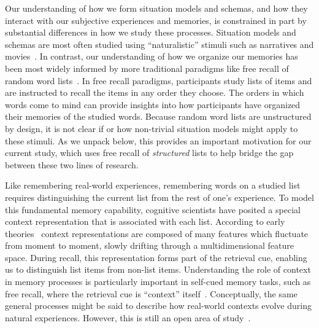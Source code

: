 \documentclass[11pt]{article}
\begin{document}

Our understanding of how we form situation models and schemas, and how they
interact with our subjective experiences and memories, is constrained in part
by substantial differences in how we study these processes. Situation models
and schemas are most often studied using ``naturalistic'' stimuli such as
narratives and movies~\citep{ZwaaEtal95,ZwaaRadv98, NastEtal20}. In contrast,
our understanding of how we organize our memories has been most widely informed
by more traditional paradigms like free recall of random word
lists~\citep{Kaha12, Kaha20}. In free recall paradigms, participants study lists of items
and are instructed to recall the items in any order they choose. The orders in
which words come to mind can provide insights into how participants have
organized their memories of the studied words. Because random word lists are
unstructured by design, it is not clear if or how non-trivial situation
models might apply to these stimuli. As we unpack below, this provides an
important motivation for our current study, which uses free recall of
\textit{structured} lists to help bridge the gap between these two lines of
research.

Like remembering real-world experiences, remembering words on a studied list
requires distinguishing the current list from the rest of one's experience. To
model this fundamental memory capability, cognitive scientists have posited a
special context representation that is associated with each list. According to
early theories~\citep[e.g.,][]{Este55a,AndeBowe72} context representations are
composed of many features which fluctuate from moment to moment, slowly
drifting through a multidimensional feature space. During recall, this
representation forms part of the retrieval cue, enabling us to distinguish list
items from non-list items. Understanding the role of context in memory
processes is particularly important in self-cued memory tasks, such as free
recall, where the retrieval cue is ``context'' itself~\citep{HowaKaha02a}.
Conceptually, the same general processes might be said to describe how
real-world contexts evolve during natural experiences. However, this is still
an open area of study~\citep{Mann20, Mann21a}.
\end{document}
